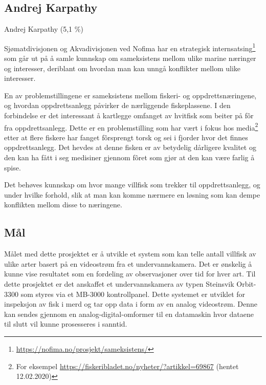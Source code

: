 \subsection{Andrej Karpathy}

Andrej Karpathy (5,1 \%)




Sjømatdivisjonen og Akvadivisjonen ved Nofima har en strategisk internsatsing\footnote{\url{https://nofima.no/prosjekt/sameksistens/}} som går ut på å samle kunnskap om sameksistens mellom ulike marine næringer og interesser, deriblant om hvordan man kan unngå konflikter mellom ulike interesser. 

En av problemstillingene er sameksistens mellom fiskeri- og oppdrettsnæringene, og hvordan oppdrettsanlegg påvirker de nærliggende fiskeplassene. I den forbindelse er det interessant å kartlegge omfanget av hvitfisk som beiter på fôr fra oppdrettsanlegg. Dette er en problemstilling som har vært i fokus hos media\footnote{For eksempel \url{https://fiskeribladet.no/nyheter/?artikkel=69867} (hentet 12.02.2020)} etter at flere fiskere har fanget fôrsprengt torsk og sei i fjorder hvor det finnes oppdrettsanlegg. Det hevdes at denne fisken er av betydelig dårligere kvalitet og den kan ha fått i seg medisiner gjennom fôret som gjør at den kan være farlig å spise. 

Det behøves kunnskap om hvor mange villfisk som trekker til oppdrettsanlegg, og under hvilke forhold, slik at man kan komme nærmere en løsning som kan dempe konflikten mellom disse to næringene. 

\subsection{Mål}

Målet med dette prosjektet er å utvikle et system som kan telle antall villfisk av ulike arter basert på en videostrøm fra et undervannskamera. Det er ønskelig å kunne vise resultatet som en fordeling av observasjoner over tid for hver art. 
Til dette prosjektet er det anskaffet et undervannskamera av typen Steinsvik Orbit-3300 som styres via et MB-3000 kontrollpanel. Dette systemet er utviklet for inspeksjon av fisk i merd og tar opp data i form av en analog videostrøm. Denne kan sendes gjennom en analog-digital-omformer til en datamaskin hvor dataene til slutt vil kunne prosesseres i sanntid. 

